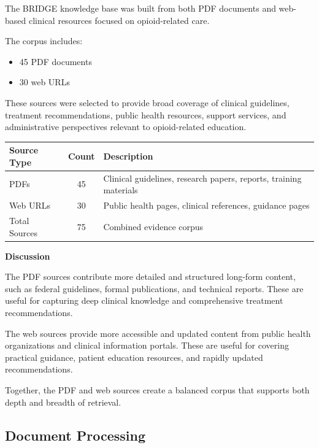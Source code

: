 \documentclass[12pt]{article}
\begin{document}
The BRIDGE knowledge base was built from both PDF documents and web-based clinical resources focused on opioid-related care.

The corpus includes:

\begin{itemize}[leftmargin=1.5em]
    \item 45 PDF documents
    \item 30 web URLs
\end{itemize}

These sources were selected to provide broad coverage of clinical guidelines, treatment recommendations, public health resources, support services, and administrative perspectives relevant to opioid-related education.

\begin{center}
\begin{tabular}{>{\raggedright\arraybackslash}p{1.6in} c >{\raggedright\arraybackslash}p{3.0in}}
\toprule
\textbf{Source Type} & \textbf{Count} & \textbf{Description} \\
\midrule
PDFs & 45 & Clinical guidelines, research papers, reports, training materials \\
Web URLs & 30 & Public health pages, clinical references, guidance pages \\
Total Sources & 75 & Combined evidence corpus \\
\bottomrule
\end{tabular}
\end{center}

\textbf{Discussion}

The PDF sources contribute more detailed and structured long-form content, such as federal guidelines, formal publications, and technical reports. These are useful for capturing deep clinical knowledge and comprehensive treatment recommendations.

The web sources provide more accessible and updated content from public health organizations and clinical information portals. These are useful for covering practical guidance, patient education resources, and rapidly updated recommendations.

Together, the PDF and web sources create a balanced corpus that supports both depth and breadth of retrieval.

\subsection{Document Processing}
\end{document}
